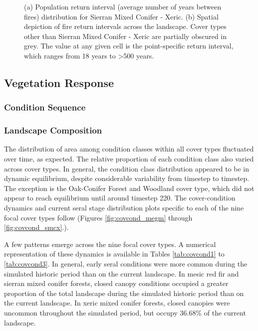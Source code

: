 \begin{figure}[!htbp]
  \centering
  \caption{(a) Population return interval (average number of years between fires) distribution for Sierran Mixed Conifer - Xeric.  (b) Spatial depiction of fire return intervals across the landscape. Cover types other than Sierran Mixed Conifer - Xeric are partially obscured in grey. The value at any given cell is the point-specific return interval, which ranges from 18 years to \textgreater 500 years.}
\label{fig:preturn_smcx}
\end{figure}

\clearpage

\subsection{Vegetation Response}
\label{subsec:HRVvegresponse}

\subsubsection{Condition Sequence}

\subsubsection{Landscape Composition}

The distribution of area among condition classes within all cover types fluctuated over time, as expected. The relative proportion of each condition class also varied across cover types. In general, the condition class distribution appeared to be in dynamic equilibrium, despite considerable variability from timestep to timestep. The exception is the Oak-Conifer Forest and Woodland cover type, which did not appear to reach equilibrium until around timestep 220. The cover-condition dynamics and current seral stage distribution plots specific to each of the nine focal cover types follow (Figures \ref{fig:covcond_megm} through \ref{fig:covcond_smcx}.).

A few patterns emerge across the nine focal cover types. A numerical representation of these dynamics is available in Tables \ref{tab:covcond1} to \ref{tab:covcond3}. In general, early seral conditions were more common during the simulated historic period than on the current landscape. In mesic red fir and sierran mixed conifer forests, closed canopy conditions occupied a greater proportion of the total landscape during the simulated historic period than on the current landscape. In xeric mixed conifer forests, closed canopies were uncommon throughout the simulated period, but occupy 36.68\% of the current landscape.

